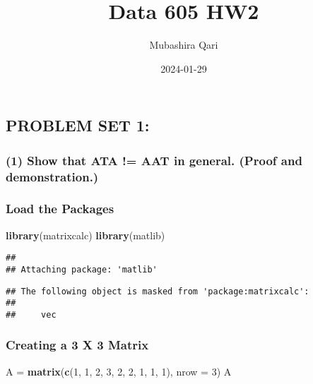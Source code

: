 \documentclass[
]{article}
\title{Data 605 HW2}
\author{Mubashira Qari}
\date{2024-01-29}
\newenvironment{Shaded}{\begin{snugshade}}{\end{snugshade}}
\newcommand{\AttributeTok}[1]{\textcolor[rgb]{0.13,0.29,0.53}{#1}}
\newcommand{\DecValTok}[1]{\textcolor[rgb]{0.00,0.00,0.81}{#1}}
\newcommand{\FunctionTok}[1]{\textcolor[rgb]{0.13,0.29,0.53}{\textbf{#1}}}
\newcommand{\NormalTok}[1]{#1}
\newcommand{\OtherTok}[1]{\textcolor[rgb]{0.56,0.35,0.01}{#1}}
\begin{document}
\maketitle

\hypertarget{problem-set-1}{%
\subsection{PROBLEM SET 1:}\label{problem-set-1}}

\hypertarget{show-that-ata-aat-in-general.-proof-and-demonstration.}{%
\subsubsection{(1) Show that ATA != AAT in general. (Proof and
demonstration.)}\label{show-that-ata-aat-in-general.-proof-and-demonstration.}}

\hypertarget{load-the-packages}{%
\subsubsection{Load the Packages}\label{load-the-packages}}

\begin{Shaded}
\begin{Highlighting}[]
\FunctionTok{library}\NormalTok{(matrixcalc)}
\FunctionTok{library}\NormalTok{(matlib)}
\end{Highlighting}
\end{Shaded}

\begin{verbatim}
## 
## Attaching package: 'matlib'
\end{verbatim}

\begin{verbatim}
## The following object is masked from 'package:matrixcalc':
## 
##     vec
\end{verbatim}

\hypertarget{creating-a-3-x-3-matrix}{%
\subsubsection{Creating a 3 X 3 Matrix}\label{creating-a-3-x-3-matrix}}

\begin{Shaded}
\begin{Highlighting}[]
\NormalTok{A }\OtherTok{=} \FunctionTok{matrix}\NormalTok{(}\FunctionTok{c}\NormalTok{(}\DecValTok{1}\NormalTok{, }\DecValTok{1}\NormalTok{, }\DecValTok{2}\NormalTok{, }\DecValTok{3}\NormalTok{, }\DecValTok{2}\NormalTok{, }\DecValTok{2}\NormalTok{, }\DecValTok{1}\NormalTok{, }\DecValTok{1}\NormalTok{, }\DecValTok{1}\NormalTok{), }\AttributeTok{nrow =} \DecValTok{3}\NormalTok{)}
\NormalTok{A}
\end{Highlighting}
\end{Shaded}
\end{document}
